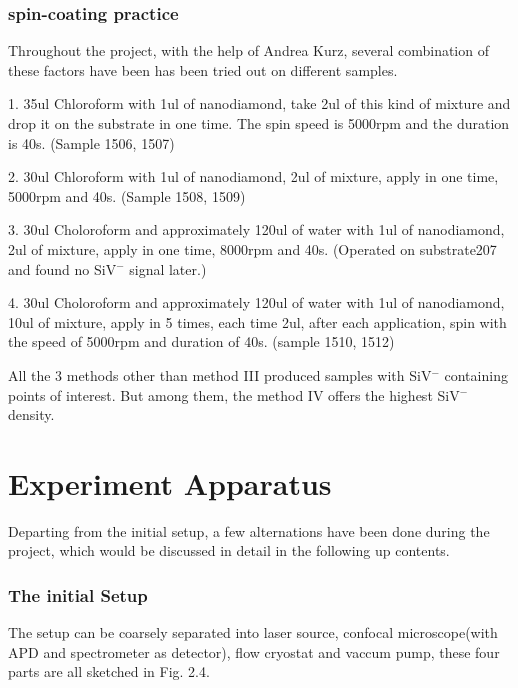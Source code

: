  
\subsubsection{spin-coating practice}
Throughout the project, with the help of Andrea Kurz, several combination of these factors have been has been tried out on different samples.

1. 35ul Chloroform with 1ul of nanodiamond, take 2ul of this kind of mixture and drop it on the substrate in one time. The spin speed is 5000rpm and the duration is 40s. (Sample 1506, 1507)

2. 30ul Chloroform with 1ul of nanodiamond, 2ul of mixture, apply in one time, 5000rpm and 40s. (Sample 1508, 1509)

3. 30ul Choloroform and approximately 120ul of water with 1ul of nanodiamond, 2ul of mixture, apply in one time, 8000rpm and 40s. (Operated on substrate207 and found no SiV$^{-}$ signal later.)

4. 30ul Choloroform and approximately 120ul of water with 1ul of nanodiamond, 10ul of mixture, apply in 5 times, each time 2ul, after each application, spin with the speed of 5000rpm and  duration of 40s. (sample 1510, 1512)

All the 3 methods other than method III produced samples with SiV$^{-}$ containing points of interest. But among them, the method IV offers the highest SiV$^{-}$ density.
 

\section[experiment apparatus]{Experiment Apparatus}

Departing from the initial setup, a few alternations have been done during the project, which would be discussed in detail in the following up contents.

\subsubsection{The initial Setup} 

The setup can be coarsely separated into laser source, confocal microscope(with APD and spectrometer as detector), flow cryostat and vaccum pump, these four parts are all sketched in Fig. 2.4.

